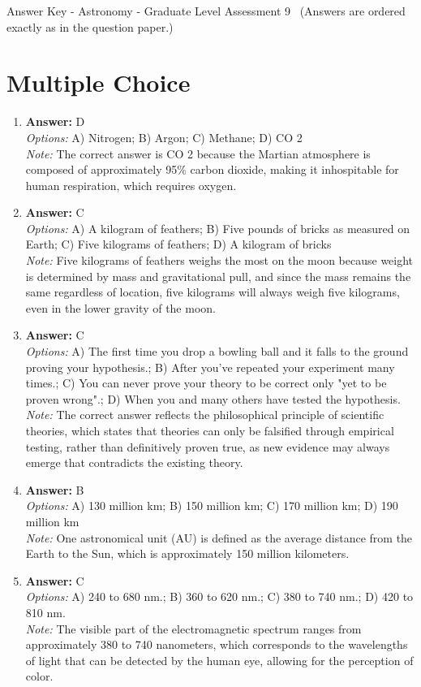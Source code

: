 \documentclass[12pt]{article}
\begin{document}
\begin{center}
Answer Key - Astronomy - Graduate Level Assessment 9 \
\small (Answers are ordered exactly as in the question paper.)
\end{center}

\section*{Multiple Choice}
\begin{enumerate}[label=\arabic*.]
\item \textbf{Answer:} D
\\ \textit{Options:} A) Nitrogen; B) Argon; C) Methane; D) CO 2
\\ \textit{Note:} The correct answer is CO 2 because the Martian atmosphere is composed of approximately 95\% carbon dioxide, making it inhospitable for human respiration, which requires oxygen.
\item \textbf{Answer:} C
\\ \textit{Options:} A) A kilogram of feathers; B) Five pounds of bricks as measured on Earth; C) Five kilograms of feathers; D) A kilogram of bricks
\\ \textit{Note:} Five kilograms of feathers weighs the most on the moon because weight is determined by mass and gravitational pull, and since the mass remains the same regardless of location, five kilograms will always weigh five kilograms, even in the lower gravity of the moon.
\item \textbf{Answer:} C
\\ \textit{Options:} A) The first time you drop a bowling ball and it falls to the ground proving your hypothesis.; B) After you've repeated your experiment many times.; C) You can never prove your theory to be correct only "yet to be proven wrong".; D) When you and many others have tested the hypothesis.
\\ \textit{Note:} The correct answer reflects the philosophical principle of scientific theories, which states that theories can only be falsified through empirical testing, rather than definitively proven true, as new evidence may always emerge that contradicts the existing theory.
\item \textbf{Answer:} B
\\ \textit{Options:} A) 130 million km; B) 150 million km; C) 170 million km; D) 190 million km
\\ \textit{Note:} One astronomical unit (AU) is defined as the average distance from the Earth to the Sun, which is approximately 150 million kilometers.
\item \textbf{Answer:} C
\\ \textit{Options:} A) 240 to 680 nm.; B) 360 to 620 nm.; C) 380 to 740 nm.; D) 420 to 810 nm.
\\ \textit{Note:} The visible part of the electromagnetic spectrum ranges from approximately 380 to 740 nanometers, which corresponds to the wavelengths of light that can be detected by the human eye, allowing for the perception of color.
\end{enumerate}
\end{document}
